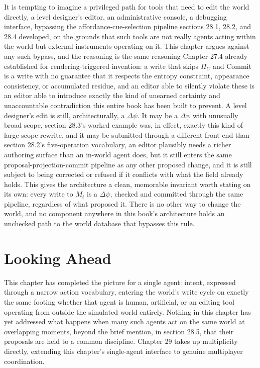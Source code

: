 It is tempting to imagine a privileged path for tools that need to edit the world directly, a level designer's editor, an administrative console, a debugging interface, bypassing the affordance-cue-selection pipeline sections 28.1, 28.2, and 28.4 developed, on the grounds that such tools are not really agents acting within the world but external instruments operating on it. This chapter argues against any such bypass, and the reasoning is the same reasoning Chapter 27.4 already established for rendering-triggered invention: a write that skips \(\Pi_C\) and Commit is a write with no guarantee that it respects the entropy constraint, appearance consistency, or accumulated residue, and an editor able to silently violate these is an editor able to introduce exactly the kind of unearned certainty and unaccountable contradiction this entire book has been built to prevent. A level designer's edit is still, architecturally, a \(\Delta\psi\). It may be a \(\Delta\psi\) with unusually broad scope, section 28.3's worked example was, in effect, exactly this kind of large-scope rewrite, and it may be submitted through a different front end than section 28.2's five-operation vocabulary, an editor plausibly needs a richer authoring surface than an in-world agent does, but it still enters the same proposal-projection-commit pipeline as any other proposed change, and it is still subject to being corrected or refused if it conflicts with what the field already holds. This gives the architecture a clean, memorable invariant worth stating on its own: every write to \(M_t\) is a \(\Delta\psi\), checked and committed through the same pipeline, regardless of what proposed it. There is no other way to change the world, and no component anywhere in this book's architecture holds an unchecked path to the world database that bypasses this rule.

\section{Looking Ahead}

This chapter has completed the picture for a single agent: intent, expressed through a narrow action vocabulary, entering the world's write cycle on exactly the same footing whether that agent is human, artificial, or an editing tool operating from outside the simulated world entirely. Nothing in this chapter has yet addressed what happens when many such agents act on the same world at overlapping moments, beyond the brief mention, in section 28.5, that their proposals are held to a common discipline. Chapter 29 takes up multiplicity directly, extending this chapter's single-agent interface to genuine multiplayer coordination.
